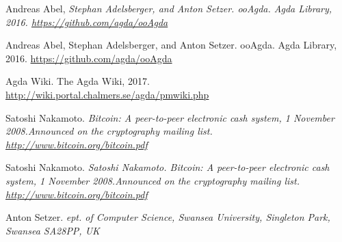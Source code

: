\documentclass[12pt]{report}
\begin{document}
\newpage
 
\begin{thebibliography}{111}

    Andreas Abel, 
    {\it Stephan Adelsberger, and Anton Setzer. ooAgda. Agda Library, 2016. 
    \url{https://github.com/agda/ooAgda}}
    
    Andreas Abel, Stephan Adelsberger, and Anton Setzer. ooAgda. Agda Library, 2016. 
    \url{https://github.com/agda/ooAgda}

    Agda Wiki.  The Agda Wiki, 2017.  
    \url{http://wiki.portal.chalmers.se/agda/pmwiki.php}
    
    Satoshi Nakamoto.  
    {\it Bitcoin:  A peer-to-peer electronic cash system, 1 November 2008.Announced on the cryptography mailing list. \url{http://www.bitcoin.org/bitcoin.pdf}}

    Satoshi Nakamoto.  
    {\it Satoshi Nakamoto.  Bitcoin:  A peer-to-peer electronic cash system, 1 November 2008.Announced on the cryptography mailing list. \url{http://www.bitcoin.org/bitcoin.pdf}}

    Anton Setzer.  
    {\it ept. of Computer Science, Swansea University, Singleton Park, Swansea SA28PP, UK}

\end{thebibliography}
\end{document}
